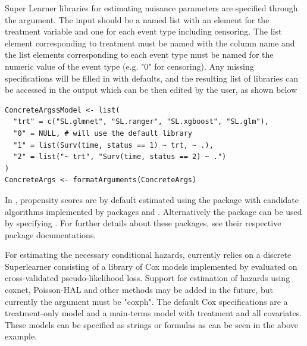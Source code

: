 \documentclass{report}
\newcommand{\1}{\ensuremath{\mathbf{1}}}
\begin{document}
Super Learner libraries for estimating nuisance parameters are specified through the  argument. The input should be a named list with an element for the treatment variable and one for each event type including censoring. The list element corresponding to treatment must be named with the column name and the list elements corresponding to each event type must be named for the numeric value of the event type (e.g. "0" for censoring). Any missing specifications will be filled in with defaults, and the resulting list of libraries can be accessed in the output  which can be then edited by the user, as shown below

\begin{lstlisting}
ConcreteArgs$Model <- list(
  "trt" = c("SL.glmnet", "SL.ranger", "SL.xgboost", "SL.glm"),
  "0" = NULL, # will use the default library
  "1" = list(Surv(time, status == 1) ~ trt, ~ .),
  "2" = list("~ trt", "Surv(time, status == 2) ~ .")
)
ConcreteArgs <- formatArguments(ConcreteArgs)
\end{lstlisting}

In , propensity scores are by default estimated using the  package  with candidate algorithms  implemented by packages  and . Alternatively the  package can be used by specifying . For further details about these packages, see their respective package documentations.

For estimating the necessary conditional hazards,  currently relies on a discrete Superlearner consisting of a library of Cox models implemented by  evaluated on cross-validated pseudo-likelihood loss. Support for estimation of hazards using coxnet, Poisson-HAL and other methods may be added in the future, but currently the  argument must be "coxph". The default Cox specifications are a treatment-only model and a main-terms model with treatment and all covariates. These models can be specified as strings or formulas as can be seen in the above example.
\end{document}
